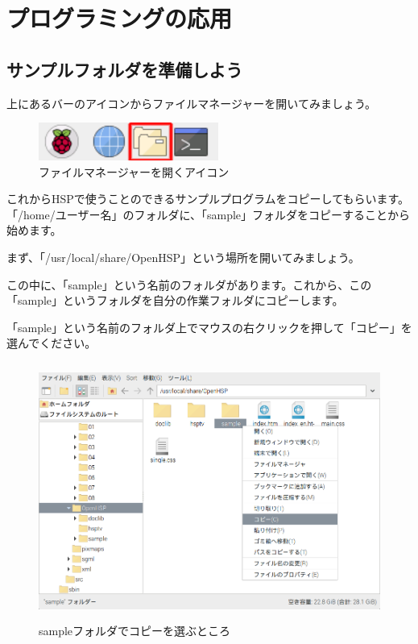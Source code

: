 \newpage
\section{プログラミングの応用}

\subsection{サンプルフォルダを準備しよう}

上にあるバーのアイコンからファイルマネージャーを開いてみましょう。

\begin{figure}[H]
    \begin{center}
      \includegraphics[keepaspectratio,width=5.898cm,height=1.242cm]{text04-img/text02-img001.png}
      \caption{ファイルマネージャーを開くアイコン}
    \end{center}
    \label{fig:prog_menu}
\end{figure}

これからHSPで使うことのできるサンプルプログラムをコピーしてもらいます。「/home/ユーザー名」のフォルダに、「sample」フォルダをコピーすることから始めます。

まず、「/usr/local/share/OpenHSP」という場所を開いてみましょう。

この中に、「sample」という名前のフォルダがあります。これから、この「sample」というフォルダを自分の作業フォルダにコピーします。

「sample」という名前のフォルダ上でマウスの右クリックを押して「コピー」を選んでください。


\begin{figure}[H]
    \begin{center}
      \includegraphics[keepaspectratio,width=11.232cm,height=8.424cm]{text04-img/s_ome04e.png}
      \caption{sampleフォルダでコピーを選ぶところ}
    \end{center}
    \label{fig:prog_menu}
\end{figure}

